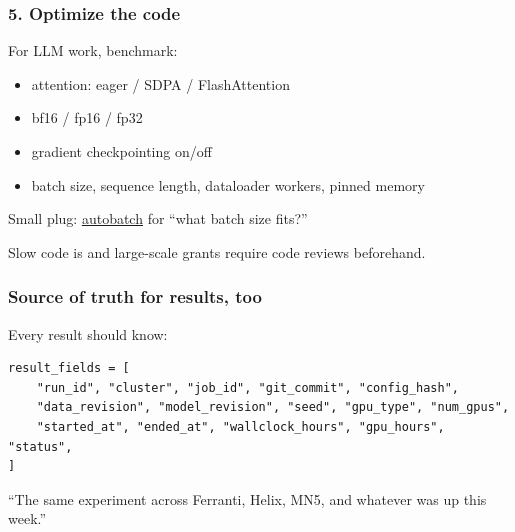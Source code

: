 \documentclass[10pt,aspectratio=169,notheorems]{beamer}
\begin{document}
\begin{frame}
    \frametitle{5. Optimize the code}
    For LLM work, benchmark:
    \begin{itemize}
        \item attention: eager / SDPA / FlashAttention
        \item bf16 / fp16 / fp32
        \item gradient checkpointing on/off
        \item batch size, sequence length, dataloader workers, pinned memory
    \end{itemize}

    \vspace{1em}
    Small plug: \href{https://github.com/bmucsanyi/autobatch}{autobatch} for ``what batch size fits?''

    \vspace{1em}
    Slow code is  and large-scale grants require code reviews beforehand.
\end{frame}

\begin{frame}[fragile]
    \frametitle{Source of truth for results, too}
    Every result should know:
    \vspace{1em}

    \begin{verbatim}
result_fields = [
    "run_id", "cluster", "job_id", "git_commit", "config_hash",
    "data_revision", "model_revision", "seed", "gpu_type", "num_gpus",
    "started_at", "ended_at", "wallclock_hours", "gpu_hours", "status",
]
    \end{verbatim}

    \vspace{0.4em}
    ``The same experiment across Ferranti, Helix, MN5, and whatever was up this week.''
\end{frame}

\end{document}
